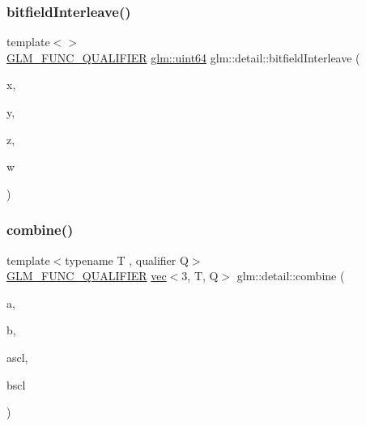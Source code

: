 \subsubsection{\texorpdfstring{bitfield\+Interleave()}{bitfieldInterleave()}\hspace{0.1cm}{\footnotesize\ttfamily [11/11]}}
{\footnotesize\ttfamily template$<$$>$ \\
\mbox{\hyperlink{setup_8hpp_a33fdea6f91c5f834105f7415e2a64407}{G\+L\+M\+\_\+\+F\+U\+N\+C\+\_\+\+Q\+U\+A\+L\+I\+F\+I\+ER}} \mbox{\hyperlink{group__gtc__type__precision_gae3632bf9b37da66233d78930dd06378a}{glm\+::uint64}} glm\+::detail\+::bitfield\+Interleave (\begin{DoxyParamCaption}\item[{\mbox{\hyperlink{group__gtc__type__precision_gad8c2939e1fdd8e5828b31d95c52255d5}{glm\+::uint16}}}]{x,  }\item[{\mbox{\hyperlink{group__gtc__type__precision_gad8c2939e1fdd8e5828b31d95c52255d5}{glm\+::uint16}}}]{y,  }\item[{\mbox{\hyperlink{group__gtc__type__precision_gad8c2939e1fdd8e5828b31d95c52255d5}{glm\+::uint16}}}]{z,  }\item[{\mbox{\hyperlink{group__gtc__type__precision_gad8c2939e1fdd8e5828b31d95c52255d5}{glm\+::uint16}}}]{w }\end{DoxyParamCaption})}

\mbox{\label{namespaceglm_1_1detail_a62c6df7a0862562560f4ff00b215f4e6}} 
\subsubsection{\texorpdfstring{combine()}{combine()}}
{\footnotesize\ttfamily template$<$typename T , qualifier Q$>$ \\
\mbox{\hyperlink{setup_8hpp_a33fdea6f91c5f834105f7415e2a64407}{G\+L\+M\+\_\+\+F\+U\+N\+C\+\_\+\+Q\+U\+A\+L\+I\+F\+I\+ER}} \mbox{\hyperlink{structglm_1_1vec}{vec}}$<$3, T, Q$>$ glm\+::detail\+::combine (\begin{DoxyParamCaption}\item[{\mbox{\hyperlink{structglm_1_1vec}{vec}}$<$ 3, T, Q $>$ const \&}]{a,  }\item[{\mbox{\hyperlink{structglm_1_1vec}{vec}}$<$ 3, T, Q $>$ const \&}]{b,  }\item[{T}]{ascl,  }\item[{T}]{bscl }\end{DoxyParamCaption})}



